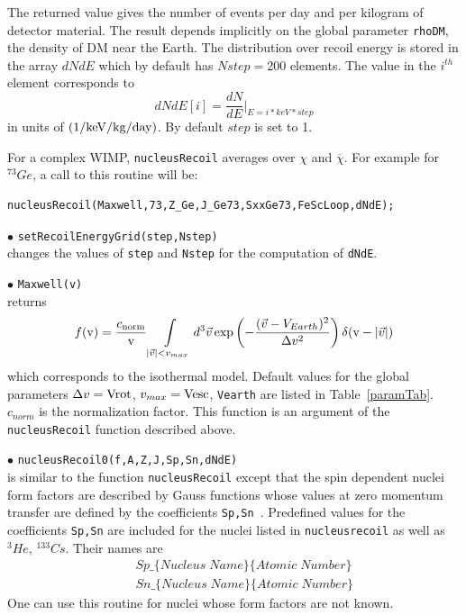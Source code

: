 \documentclass[12pt,a4paper]{article}
\begin{document}
The returned value gives the number of events per day and per kilogram of 
detector material. The  result depends  implicitly on the  global  parameter \verb|rhoDM|, the
density of DM near the Earth.
The distribution over recoil energy is stored in the array 
$dNdE$ which by default has $Nstep=200$ elements.  
The value in the $i^{th}$ element corresponds to
$$
dNdE[i] = \frac{dN}{dE}|_{E=i*keV*step}
$$
in units of ${\rm (1/keV/kg/day)}$. By default $step$  is set to 1. 

For a complex WIMP, \verb|nucleusRecoil| averages over $\chi$ and
$\overline{\chi}$. For example for $^{73}Ge$, a call to this routine will be: 
\begin{verbatim}
nucleusRecoil(Maxwell,73,Z_Ge,J_Ge73,SxxGe73,FeScLoop,dNdE);
\end{verbatim}


\noindent
$\bullet$ \verb|setRecoilEnergyGrid(step,Nstep)| \\
changes the values of \verb|step| and \verb|Nstep| for the computation of \verb|dNdE|.


\noindent
$\bullet$ \verb|Maxwell(v)| \\
returns   
$$f(\mbox{v})= \frac{c_{\rm{norm}}}{\mbox{v}}\int\limits_{|\vec{v}|<v_{max}} d^3\vec{v} \exp\left(
-\frac{(\vec{v}-V_{Earth})^2}{\Delta v^2}\right)\delta(\mbox{v} -|\vec{v}|)
$$
which corresponds to the isothermal model. Default values for the global parameters 
$\Delta v ={\rm Vrot}$,  $v_{max}={\rm Vesc}$, \verb|Vearth| are listed in Table~\ref{paramTab}.
$c_{norm}$ is the normalization factor.  This function is an
argument of the \verb|nucleusRecoil| function described above.


\noindent
$\bullet$ \verb|nucleusRecoil0(f,A,Z,J,Sp,Sn,dNdE)|\\
is similar to the  function \verb|nucleusRecoil| except that 
the spin dependent nuclei form factors are described by Gauss functions
whose values  at zero momentum transfer are defined by the coefficients \verb|Sp,Sn|~\cite{Belanger:2008sj}. 
Predefined values for the coefficients \verb|Sp,Sn| are included for the
nuclei listed in \verb|nucleusrecoil| as well as ${}^3He$, ${}^{133}Cs$. Their  names are 
\begin{eqnarray}
    &&Sp\_\{Nucleus\; Name\}\{Atomic \;Number\} \nonumber\\
    &&Sn\_\{Nucleus\; Name\}\{Atomic\; Number\} \nonumber
\end{eqnarray}
One can use this routine for nuclei whose form factors  are not known. 
\end{document}
